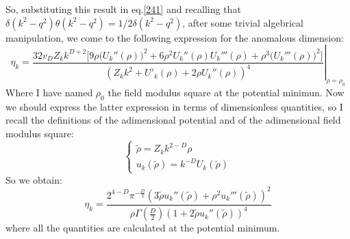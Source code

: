 So, substituting this result in eq.\eqref{241} and recalling that $\delta(k^2 - q^2)\theta(k^2 - q^2)  = 1/2\delta(k^2 - q^2)$, after some trivial algebrical manipulation, we come to the following expression for the anomalous dimension:
\begin{equation}
  \eta_k = \left.\frac{32 v_D Z_k k^{D + 2}\Big[9\rho\big(U_k''(\rho)\big)^2+ 6 \rho^2 U_k''(\rho)U_k'''(\rho)+ \rho^{3} \big(U_k'''(\rho)\big)^2\Big]}{(Z_kk^2 + U'_k(\rho) + 2\rho U_k''(\rho))^4}\right|_{\rho = \rho_0}
\end{equation}
Where I have named $\rho_0$ the field modulus square at the potential minimun.
Now we should express the latter expression in terms of dimensionless quantities, so I recall the definitions of the adimensional potential and of the adimensional field modulus square:
\begin{displaymath}
\left\{
\begin{array}{l}
\widetilde{\rho} = Z_k k^{2-D} \rho \\
u_k({\widetilde{\rho}}) = k^{-D} U_k(\widetilde{\rho})
\end{array}
\right.
\end{displaymath}
So we obtain:
\begin{equation}
\eta_k = \frac{2^{4-D} \pi ^{-\frac{D}{2}} \left(3 \widetilde{\rho} u_k''(\widetilde{\rho} ) +\rho ^2 u_k'''(\widetilde{\rho} )\right)^2}{\rho  \Gamma \left(\frac{D}{2}\right) (1 + 2 \widetilde{\rho} u_k''(\widetilde{\rho}))^4}
\end{equation}
where all the quantities are calculated at the potential minimum.











